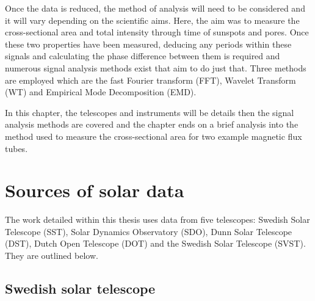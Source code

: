 	Once the data is reduced, the method of analysis will need to be considered and it will vary depending on the scientific aims.
	Here, the aim was to measure the cross-sectional area and total intensity through time of sunspots and pores.
    Once these two properties have been measured, deducing any periods within these signals and calculating the phase difference between them is required and numerous signal analysis methods exist that aim to do just that.
    Three methods are employed which are the fast Fourier transform (FFT), Wavelet Transform (WT) and Empirical Mode Decomposition (EMD).  

    In this chapter, the telescopes and instruments will be details then the signal analysis methods are covered and the chapter ends on a brief analysis into the method used to measure the cross-sectional area for two example magnetic flux tubes.
	
\section{Sources of solar data}

	The work detailed within this thesis uses data from five telescopes: Swedish Solar Telescope (SST), Solar Dynamics Observatory (SDO), Dunn Solar Telescope (DST), Dutch Open Telescope (DOT) and the Swedish Solar Telescope (SVST).
    They are outlined below.
    
\subsection{Swedish solar telescope}
\label{SST}

